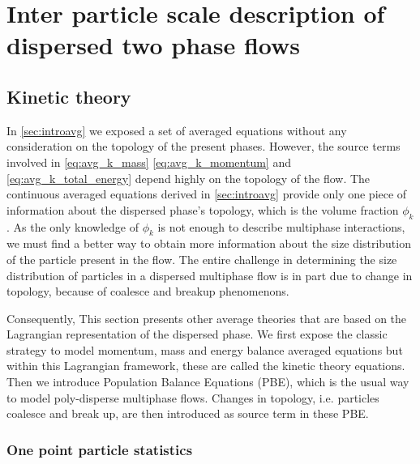 \chapter{Inter particle scale description of dispersed two phase flows}

\section{Kinetic theory}
\label{sec:PBE}

In \ref{sec:introavg} we exposed a set of averaged equations without any consideration on the topology of the present phases. 
However, the source terms involved in \ref{eq:avg_k_mass} \ref{eq:avg_k_momentum} and \ref{eq:avg_k_total_energy} depend highly on the topology of the flow. 
The continuous averaged equations derived in \ref{sec:introavg} provide only one piece of information about the dispersed phase's topology, which is the volume fraction $\phi_k$.
As the only knowledge of $\phi_k$ is not enough to describe multiphase interactions, we must find a better way to obtain more information about the size distribution of the particle present in the flow.
The entire challenge in determining the size distribution of particles in a dispersed multiphase flow is in part due to change in topology, because of coalesce and breakup phenomenons. 

Consequently, This section presents other average theories that are based on the Lagrangian representation of the dispersed phase. 
We first expose the classic strategy to model momentum, mass and energy balance averaged equations but within this Lagrangian framework, these are called the kinetic theory equations. 
Then we introduce Population Balance Equations (PBE), which is the usual way to model poly-disperse multiphase flows. 
Changes in topology, i.e. particles coalesce and break up, are then introduced as source term in these PBE. 


\subsection{One point particle statistics}

